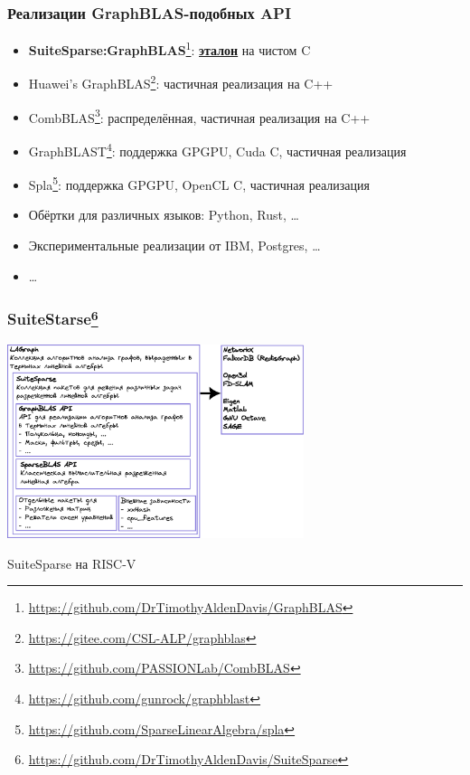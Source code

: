 \documentclass[xcolor=table,aspectratio=169]{beamer}
\begin{document}
\begin{frame}[fragile]
  \frametitle{Реализации GraphBLAS-подобных API}
  \begin{itemize}
      \item \textbf{SuiteSparse:GraphBLAS}\footnote{\url{https://github.com/DrTimothyAldenDavis/GraphBLAS}}: \underline{\textbf{эталон}} на чистом C
      \item Huawei's GraphBLAS\footnote{\url{https://gitee.com/CSL-ALP/graphblas}}: частичная реализация на C++
      \item CombBLAS\footnote{\url{https://github.com/PASSIONLab/CombBLAS}}: распределённая, частичная реализация на C++
      \item GraphBLAST\footnote{\url{https://github.com/gunrock/graphblast}}: поддержка GPGPU, Cuda C, частичная реализация
      \item Spla\footnote{\url{https://github.com/SparseLinearAlgebra/spla}}: поддержка GPGPU, OpenCL C, частичная реализация
      \item Обёртки для различных языков: Python, Rust, \ldots
      \item Экспериментальные реализации от IBM, Postgres, \ldots
      \item \ldots
  \end{itemize}
\end{frame}

\begin{frame}[fragile]
  \frametitle{SuiteStarse\footnote{\url{https://github.com/DrTimothyAldenDavis/SuiteSparse}}}
  \begin{center}
      \includegraphics[width=0.65\textwidth]{pictures/SuiteSparse.pdf}
  \end{center}
\end{frame}

\begin{frame}[fragile]  
  \begin{center}
      \huge{SuiteSparse на RISC-V}
  \end{center}
\end{frame}
\end{document}
